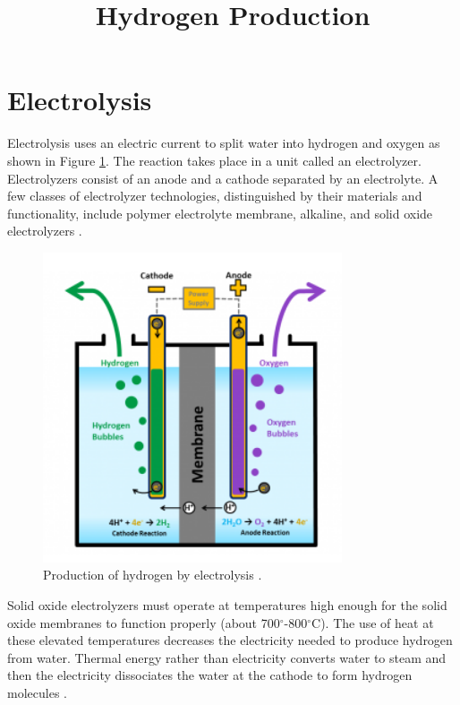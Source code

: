 \documentclass[11pt,letterpaper]{article}
\title{Hydrogen Production}
\begin{document}

\section{Electrolysis}

Electrolysis uses an electric current to split water into hydrogen and oxygen as shown in Figure \ref{fig:electro}.
The reaction takes place in a unit called an electrolyzer.
Electrolyzers consist of an anode and a cathode separated by an electrolyte.
A few classes of electrolyzer technologies, distinguished by their materials and functionality, include polymer electrolyte membrane, alkaline, and solid oxide electrolyzers \cite{doe_office_of_energy_efficiency_and_renewable_energy_hydrogen_2020}.

\begin{figure}[]
	\centering
	\includegraphics[width=0.55\linewidth]{figures/electrolysis.png}
	\hfill
	\caption{Production of hydrogen by electrolysis \cite{doe_office_of_energy_efficiency_and_renewable_energy_hydrogen_2020}.}
	\label{fig:electro}
\end{figure}

Solid oxide electrolyzers must operate at temperatures high enough for the solid oxide membranes to function properly (about 700$^{\circ}$-800$^{\circ}$C).
The use of heat at these elevated temperatures decreases the electricity needed to produce hydrogen from water.
Thermal energy rather than electricity converts water to steam and then the electricity dissociates the water at the cathode to form hydrogen molecules \cite{xu_introduction_2017}.
\end{document}

